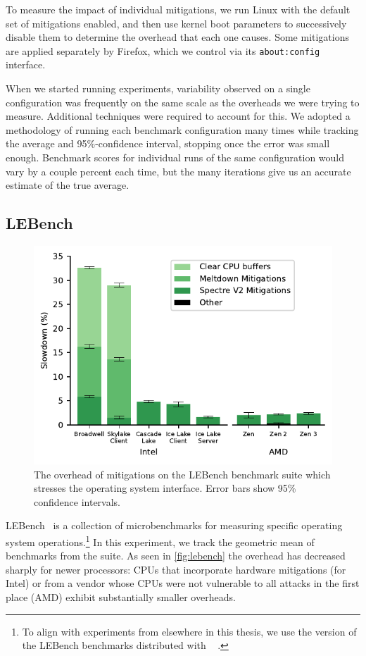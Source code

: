 To measure the impact of individual mitigations, we run  Linux with the default set of mitigations enabled, and then use kernel boot parameters to successively disable them to determine the overhead that each one causes.
Some mitigations are applied separately by Firefox, which we control via its \texttt{about:config} interface.

When we started running experiments, variability observed on a single configuration was frequently on the same scale as the overheads we were trying to measure.
Additional techniques were required to account for this.
We adopted a methodology of running each benchmark configuration many times while tracking the average and 95\%-confidence interval, stopping once the error was small enough.
Benchmark scores for individual runs of the same configuration would vary by a couple percent each time, but the many iterations give us an accurate estimate of the true average.

\subsection{LEBench}
\label{sec:benchmarks:lebench}

\begin{figure}[t]
    \includegraphics[width=\columnwidth]{plots/lebench.pdf}
    \caption{The overhead of mitigations on the LEBench benchmark suite which stresses the operating system interface. Error bars show 95\% confidence intervals.}
    \label{fig:lebench}
\end{figure}


LEBench~\cite{ren:lebench} is a collection of microbenchmarks for measuring specific operating system operations.\footnote{To align with experiments from elsewhere in this thesis, we use the version of the LEBench benchmarks distributed with \sys~\cite{behrens:ward} .}
In this experiment, we track the geometric mean of benchmarks from the suite.
As seen in \autoref{fig:lebench} the overhead has decreased sharply for newer processors:
CPUs that incorporate hardware mitigations (for Intel) or from a vendor whose CPUs were not vulnerable to all attacks in the first place (AMD) exhibit substantially smaller overheads.


